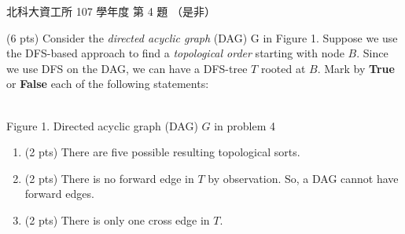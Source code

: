 \begin{pastexam}[label={px:ntut-107-ci-04}]{北科大資工所 107 學年度 第 4 題}
（是非）

(6 pts) Consider the \textit{directed acyclic graph} (DAG) G in Figure 1. Suppose we use the
DFS-based approach to find a \textit{topological order} starting with node $B$. Since we use DFS
on the DAG, we can have a DFS-tree $T$ rooted at $B$. Mark by \textbf{True} or \textbf{False} each
of the following statements:

\begin{center}
\\[2pt]
Figure 1. Directed acyclic graph (DAG) $G$ in problem 4\end{center}
\begin{enumerate}[label=(\arabic*)]
\item (2 pts) There are five possible resulting topological sorts.
\item (2 pts) There is no forward edge in $T$ by observation. So, a DAG cannot have forward edges.
\item (2 pts) There is only one cross edge in $T$.
\end{enumerate}
\end{pastexam}

